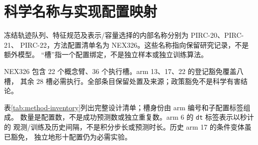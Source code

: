 \section{科学名称与实现配置映射}
\label{sec:method-implementation-map}\hypertarget{sec:method-implementation-map}{}
冻结轨迹队列、特征规范及表示/容量选择的内部名称分别为 PIRC-20、PIRC-21、
PIRC-22，方法配置清单名为 NEX326。这些名称指向保留研究记录，不是额外模型。
“槽”指一个配置绑定，不是独立样本或独立训练算法。

NEX326 包含 22 个概念臂、36 个执行槽。arm 13、17、22 的登记豁免覆盖八槽，
其余 28 槽必需执行。全部条目保留处置及来源；政策豁免不是科学有害结论。

\noindent 表\ref{tab:method-inventory}列出完整设计清单；槽身份由 arm 编号和子配置标签组成。
数量是配置数，不是成功预测数或独立重复数。arm 6 的 \texttt{dt} 标签表示以秒计的
观测/训练及历史间隔，不是积分步长或预测时长。历史 arm 17 的条件变体虽已豁免，
独立地形十配置仍为必需实验。

